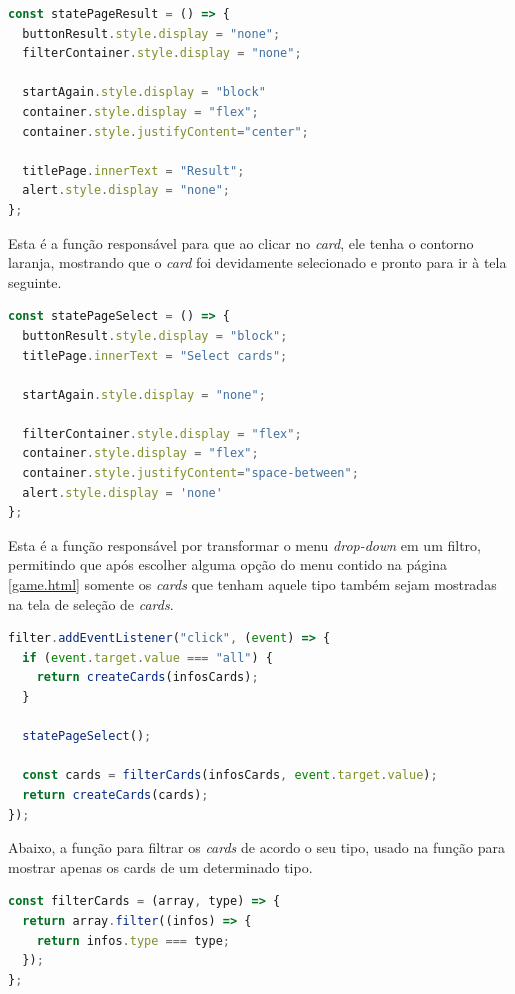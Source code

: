\begin{lstlisting}[language=JavaScript, caption=Função para mostrar os \textit{cards} selecionadas]
const statePageResult = () => {
  buttonResult.style.display = "none";
  filterContainer.style.display = "none";

  startAgain.style.display = "block"
  container.style.display = "flex";
  container.style.justifyContent="center";

  titlePage.innerText = "Result";
  alert.style.display = "none";
};
\end{lstlisting}

Esta é a função responsável para que ao clicar no \textit{card}, ele tenha o contorno laranja, mostrando que o \textit{card} foi devidamente selecionado e pronto para ir à tela seguinte.

\begin{lstlisting}[language=JavaScript, caption=Função para selecionar os \textit{cards}]
const statePageSelect = () => {
  buttonResult.style.display = "block";
  titlePage.innerText = "Select cards";

  startAgain.style.display = "none";

  filterContainer.style.display = "flex";
  container.style.display = "flex";
  container.style.justifyContent="space-between";
  alert.style.display = 'none'
};
\end{lstlisting}

Esta é a função responsável por transformar o menu \textit{drop-down} em um filtro, permitindo que após escolher alguma opção do menu contido na página \ref{game.html} somente os \textit{cards} que tenham aquele tipo também sejam mostradas na tela de seleção de \textit{cards}.
\begin{lstlisting}[language=JavaScript, caption=Função que faz os filtros dos cards]
filter.addEventListener("click", (event) => {
  if (event.target.value === "all") {
    return createCards(infosCards);
  }

  statePageSelect();

  const cards = filterCards(infosCards, event.target.value);
  return createCards(cards);
});
\end{lstlisting}

Abaixo, a função para filtrar os \textit{cards} de acordo o seu tipo, usado na função para mostrar apenas os cards de um determinado tipo.
\begin{lstlisting}[language=JavaScript, caption=Função que filtra o array]
const filterCards = (array, type) => {
  return array.filter((infos) => {
    return infos.type === type;
  });
};
\end{lstlisting}


